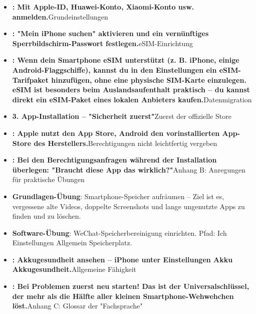

\begin{itemize}
  \item \textbf{: Mit Apple-ID, Huawei-Konto, Xiaomi-Konto usw. anmelden.}Grundeinstellungen
  \item \textbf{: "Mein iPhone suchen" aktivieren und ein vernünftiges Sperrbildschirm-Passwort festlegen.}eSIM-Einrichtung
  \item \textbf{: Wenn dein Smartphone eSIM unterstützt (z. B. iPhone, einige Android-Flaggschiffe), kannst du in den Einstellungen ein eSIM-Tarifpaket hinzufügen, ohne eine physische SIM-Karte einzulegen. eSIM ist besonders beim Auslandsaufenthalt praktisch – du kannst direkt ein eSIM-Paket eines lokalen Anbieters kaufen.}Datenmigration
\end{itemize}


\begin{itemize}
  \item \textbf{3. App-Installation – "Sicherheit zuerst"}Zuerst der offizielle Store
  \item \textbf{: Apple nutzt den App Store, Android den vorinstallierten App-Store des Herstellers.}Berechtigungen nicht leichtfertig vergeben
  \item \textbf{: Bei den Berechtigungsanfragen während der Installation überlegen: "Braucht diese App das wirklich?"}Anhang B: Anregungen für praktische Übungen
  \item \textbf{Grundlagen-Übung}: Smartphone-Speicher aufräumen – Ziel ist es, vergessene alte Videos, doppelte Screenshots und lange ungenutzte Apps zu finden und zu löschen.
  \item \textbf{Software-Übung}: WeChat-Speicherbereinigung einrichten. Pfad: Ich Einstellungen Allgemein Speicherplatz.
\end{itemize}


\begin{itemize}
  \item \textbf{: Akkugesundheit ansehen – iPhone unter Einstellungen Akku Akkugesundheit.}Allgemeine Fähigkeit
  \item \textbf{: Bei Problemen zuerst neu starten! Das ist der Universalschlüssel, der mehr als die Hälfte aller kleinen Smartphone-Wehwehchen löst.}Anhang C: Glossar der "Fachsprache"
\end{itemize}
